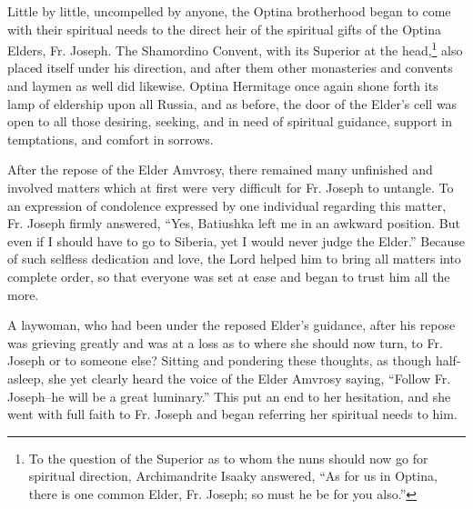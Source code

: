 Little by little, uncompelled by anyone, the Optina brotherhood began to come with their spiritual needs to the direct heir of the spiritual gifts of the Optina Elders, Fr. Joseph. The Shamordino Convent, with its Superior at the head,\footnote{To the question of the Superior as to whom the nuns should now go for spiritual direction, Archimandrite Isaaky answered, ``As for us in Optina, there is one common Elder, Fr. Joseph; so must he be for you also.''} also placed itself under his direction, and after them other monasteries and convents and laymen as well did likewise. Optina Hermitage once again shone forth its lamp of eldership upon all Russia, and as before, the door of the Elder's cell was open to all those desiring, seeking, and in need of spiritual guidance, support in temptations, and comfort in sorrows.

After the repose of the Elder Amvrosy, there remained many unfinished and involved matters which at first were very difficult for Fr. Joseph to untangle. To an expression of condolence expressed by one individual regarding this matter, Fr. Joseph firmly answered, ``Yes, Batiushka left me in an awkward position. But even if I should have to go to Siberia, yet I would never judge the Elder.'' Because of such selfless dedication and love, the Lord helped him to bring all matters into complete order, so that everyone was set at ease and began to trust him all the more.

A laywoman, who had been under the reposed Elder's guidance, after his repose was grieving greatly and was at a loss as to where she should now turn, to Fr. Joseph or to someone else? Sitting and pondering these thoughts, as though half-asleep, she yet clearly heard the voice of the Elder Amvrosy saying, ``Follow Fr. Joseph--he will be a great luminary.'' This put an end to her hesitation, and she went with full faith to Fr. Joseph and began referring her spiritual needs to him.
